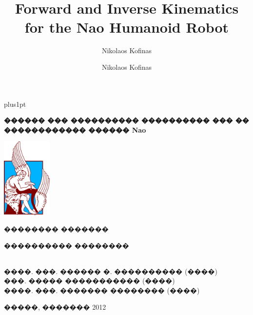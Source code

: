 \documentclass[report,12pt]{Classes/CUEDthesisPSnPDF}
\title{{\LARGE Forward and Inverse Kinematics\\for the Nao Humanoid Robot}}%
\author{Nikolaos Kofinas}
\author{Nikolaos Kofinas}
\begin{document}
\en

 \renewcommand\baselinestretch{1.2}
\baselineskip=18pt plus1pt

%   




\maketitle
    \cleardoublepage
 {\gr
     \thispagestyle{empty}
  \begin{center}
    \setlength{\parskip}{0pt}
    {\large {} \par}
      \vspace*{1ex}
    {\large {} \par}
      \vspace*{20mm}
    { \Large {\bfseries {{\LARGE \gr ������ ��� ���������� ���������� ��� �� ������������ ������ Nao}}} \par}
	{\large \vspace*{10mm} {\includegraphics[height=40mm]{Figures/TUClogocolor.jpg} \par} \vspace*{15mm}}	
    {{\Large �������� �������} \par}
	\vspace*{15mm}
    {\large {\begin{normalsize}���������� ��������\end{normalsize}\\
����. ���. ������ �. ���������� (����)\\
���. ����� ����������� (����)\\
����. ���. ������� �������� (����)} \par}
	\vfill
    {\large �����, ������� 2012}
  \end{center}
  \null\vfill
}
    \cleardoublepage
\end{document}

